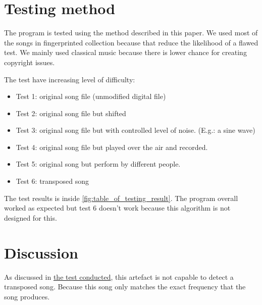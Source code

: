 \cite{wang_systems_2013}\cite{macleod_abracadabra_nodate}\cite{yang_music_2001}

\chapter{Testing method}
The program is tested using the method described in this paper.\cite{yang_music_2001} We used most of the songs in fingerprinted collection because that reduce the likelihood of a flawed test. We mainly used classical music because there is lower chance for creating copyright issues.

The test have increasing level of difficulty:
\begin{itemize}
    \item Test 1: original song file (unmodified digital file)
    \item Test 2: original song file but shifted 
    \item Test 3: original song file but with controlled level of noise. (E.g.: a sine wave)
    \item Test 4: original song file but played over the air and recorded.
    \item Test 5: original song but perform by different people.
    \item Test 6: transposed song \label{t:test_transposed}
\end{itemize}
The test results is inside \ref{fig:table_of_testing_result}.
The program overall worked as expected but test 6 doesn't work because this algorithm is not designed for this.

\chapter{Discussion}
As discussed in \hyperref[t:test_transposed]{the test conducted}, this artefact is not capable to detect a transposed song. Because this song only matches the exact frequency that the song produces. 
